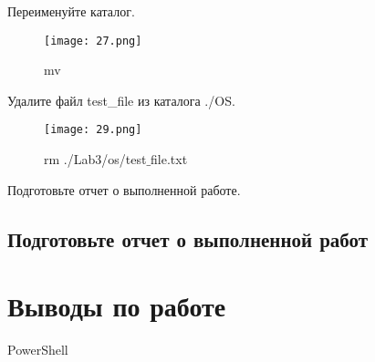\documentclass[a4paper]{article}
\begin{document}
Переименуйте каталог.

\begin{figure}[H]
    \centering
    \texttt{[image: 27.png]}
    \caption{mv}
\end{figure}

Удалите файл test\_file из каталога ./OS.

\begin{figure}[H]
    \centering
    \texttt{[image: 29.png]}
    \caption{rm ./Lab3/os/test$\_$file.txt}
\end{figure}


Подготовьте отчет о выполненной работе.
\subsection{Подготовьте отчет о выполненной работ}


\section{Выводы по работе}

PowerShell
\end{document}
